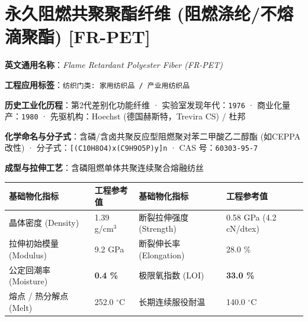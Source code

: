 \documentclass[11pt,openright,twoside,UTF8]{ctexbook}
\begin{document}
\section{永久阻燃共聚聚酯纤维 (阻燃涤纶/不熔滴聚酯) [FR-PET]}
\label{sec:fr-pet}

\noindent\textbf{英文通用名称}：\textit{Flame Retardant Polyester Fiber (FR-PET)}\par
\noindent\textbf{工程应用标签}：\texttt{纺织门类: 家用纺织品 / 产业用纺织品}\par
\noindent\textbf{历史工业化历程}：第2代差别化功能纤维 · 实验室发现年代：\texttt{1976} · 商业化量产：\texttt{1980} · 先驱机构：Hoechst (德国赫斯特，Trevira CS) / 杜邦\par
\noindent\textbf{化学命名与分子式}：含磷/含卤共聚反应型阻燃聚对苯二甲酸乙二醇酯 (如CEPPA改性) · 分子式：\texttt{[(C10H8O4)x(C9H9O5P)y]n} · CAS 号：\texttt{60303-95-7}\par
\noindent\textbf{成型与拉伸工艺}：含磷阻燃单体共聚连续聚合熔融纺丝\par

\vspace{0.15cm}
\begin{center}
\small
\begin{tabularx}{\textwidth}{p{3.8cm}Xp{3.8cm}X}
\toprule
\textbf{基础物化指标} & \textbf{工程参考值} & \textbf{基础物化指标} & \textbf{工程参考值} \\
\midrule
晶体密度 (Density) & 1.39 g/cm$^3$ & 断裂拉伸强度 (Strength) & 0.58 GPa (4.2 cN/dtex) \\
拉伸初始模量 (Modulus) & 9.2 GPa & 断裂伸长率 (Elongation) & 28.0 \% \\
公定回潮率 (Moisture) & \textbf{0.4 \%} & 极限氧指数 (LOI) & \textbf{33.0 \%} \\
熔点 / 热分解点 (Melt) & 252.0 $^\circ\mathrm{C}$ & 长期连续服役耐温 & 140.0 $^\circ\mathrm{C}$ \\
\bottomrule
\end{tabularx}
\end{center}
\vspace{0.15cm}
\end{document}
